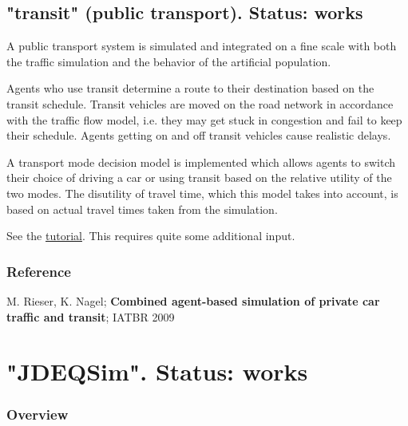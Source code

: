 \umbruch
\subsection{"transit" (public transport).  Status: works}


A  public transport system is simulated and integrated on a fine scale  with both the traffic simulation and the behavior of the artificial  population.

Agents who use transit determine a route to their destination based  on the transit schedule. Transit vehicles are moved on the road network  in accordance with the traffic flow model, i.e. they may get stuck in  congestion and fail to keep their schedule. Agents getting on and off  transit vehicles cause realistic delays.

A transport mode decision model is implemented which allows agents to  switch their choice of driving a car or using transit based on the  relative utility of the two modes. The disutility of travel time, which  this model takes into account, is based on actual travel times taken  from the simulation.

See the \href{http://matsim.org/docs/tutorials/transit}{tutorial}. This requires quite some additional input.

\subsubsection{Reference}

M. Rieser, K. Nagel; \textbf{Combined agent-based simulation of private car traffic and transit}; IATBR 2009

\umbruch
\section{"JDEQSim".  Status: works}


\subsubsection{Overview}

